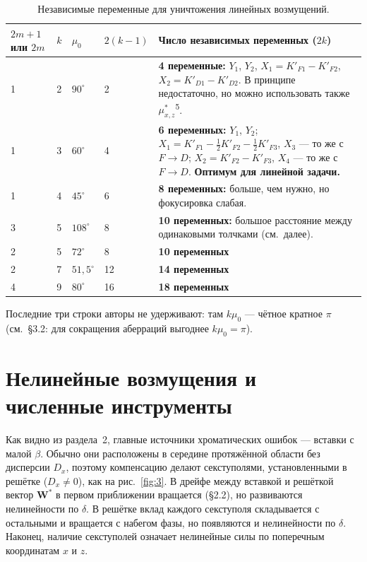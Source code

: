 \documentclass[11pt,a4paper]{article}
\begin{document}
\begin{table}[H]
\centering
\caption{Независимые переменные для уничтожения линейных возмущений.}
\label{tab:I}
\small
\begin{tabular}{@{}llllp{8.2cm}@{}}
\toprule
$2m+1$ или $2m$ & $k$ & $\mu_0$ & $2(k-1)$ & Число независимых переменных ($2k$) \\
\midrule
1 & 2 & $90^\circ$ & 2 &
\textbf{4 переменные:} $Y_1$, $Y_2$,
$X_1=K'_{F1}-K'_{F2}$, $X_2=K'_{D1}-K'_{D2}$.
В принципе недостаточно, но можно использовать также $\mu^*_{x,z}$\textsuperscript{5}. \\[0.6em]
1 & 3 & $60^\circ$ & 4 &
\textbf{6 переменных:} $Y_1$, $Y_2$;
$X_1=K'_{F1}-\tfrac12 K'_{F2}-\tfrac12 K'_{F3}$,
$X_3$ --- то же с $F\to D$;
$X_2=K'_{F2}-K'_{F3}$, $X_4$ --- то же с $F\to D$.
\textbf{Оптимум для линейной задачи.} \\[0.6em]
1 & 4 & $45^\circ$ & 6 &
\textbf{8 переменных:} больше, чем нужно, но фокусировка слабая. \\[0.6em]
3 & 5 & $108^\circ$ & 8 &
\textbf{10 переменных:} большое расстояние между одинаковыми толчками (см.\ далее). \\[0.6em]
2 & 5 & $72^\circ$ & 8 &
\textbf{10 переменных} \\
2 & 7 & $51{,}5^\circ$ & 12 &
\textbf{14 переменных} \\
4 & 9 & $80^\circ$ & 16 &
\textbf{18 переменных} \\
\bottomrule
\end{tabular}

\vspace{0.4em}
{\footnotesize Последние три строки авторы не удерживают: там $k\mu_0$ --- чётное
кратное $\pi$ (см.\ §3.2: для сокращения аберраций выгоднее $k\mu_0=\pi$).}
\end{table}

\section{Нелинейные возмущения и численные инструменты}

Как видно из раздела~2, главные источники хроматических ошибок --- вставки с
малой $\beta$. Обычно они расположены в середине протяжённой области без
дисперсии $D_x$, поэтому компенсацию делают секступолями, установленными в
решётке ($D_x\neq 0$), как на рис.~\ref{fig:3}. В дрейфе между вставкой и
решёткой вектор $\mathbf{W}^*$ в первом приближении вращается (§2.2), но
развиваются нелинейности по $\delta$. В решётке вклад каждого секступоля
складывается с остальными и вращается с набегом фазы, но появляются и
нелинейности по $\delta$. Наконец, наличие секступолей означает нелинейные силы
по поперечным координатам $x$ и $z$.
\end{document}
